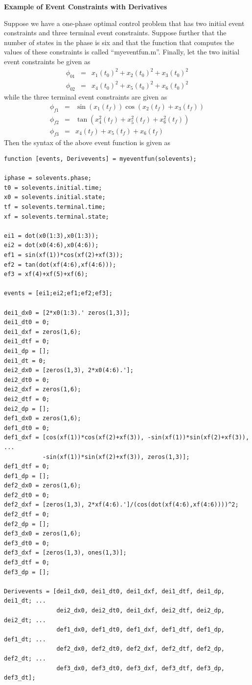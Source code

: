 \documentclass[10pt,final]{report}
\newenvironment{shadedframe}{%
  \def\FrameCommand{\fcolorbox{black}{shadecolor}}%
  \MakeFramed {\FrameRestore}}
{\endMakeFramed}
\begin{document}
\begin{shadedframe}
{\noindent}{\bf Example of Event Constraints with Derivatives}
\vspace{12pt}

{\noindent}Suppose we have a one-phase optimal control problem that has two
initial event constraints and three terminal event constraints.  Suppose
further that the number of states in the phase is six and that the function
that computes the values of these constraints is called ``myeventfun.m''.
Finally, let the two initial event constraints be given as
\begin{displaymath}
  \begin{array}{lcl}
    \phi_{01} & = & x_1(t_0)^2+x_2(t_0)^2+x_3(t_0)^2 \\
    \phi_{02} & = & x_4(t_0)^2+x_5(t_0)^2+x_6(t_0)^2
  \end{array}
\end{displaymath}
while the three terminal event constraints are given as
\begin{displaymath}
  \begin{array}{lcl}
    \phi_{f1} & = & \sin(x_1(t_f))\cos(x_2(t_f)+x_3(t_f)) \\
    \phi_{f2} & = & \tan(x_4^2(t_f)+x_5^2(t_f)+x_6^2(t_f)) \\
    \phi_{f3} & = & x_4(t_f)+x_5(t_f)+x_6(t_f)
  \end{array}
\end{displaymath}
Then the syntax of the above event function is given as
\begin{verbatim}
function [events, Derivevents] = myeventfun(solevents);

iphase = solevents.phase;
t0 = solevents.initial.time;
x0 = solevents.initial.state;
tf = solevents.terminal.time;
xf = solevents.terminal.state;

ei1 = dot(x0(1:3),x0(1:3));
ei2 = dot(x0(4:6),x0(4:6));
ef1 = sin(xf(1))*cos(xf(2)+xf(3));
ef2 = tan(dot(xf(4:6),xf(4:6)));
ef3 = xf(4)+xf(5)+xf(6);

events = [ei1;ei2;ef1;ef2;ef3];

dei1_dx0 = [2*x0(1:3).' zeros(1,3)];
dei1_dt0 = 0;
dei1_dxf = zeros(1,6);
dei1_dtf = 0;
dei1_dp = [];
dei1_dt = 0;
dei2_dx0 = [zeros(1,3), 2*x0(4:6).'];
dei2_dt0 = 0;
dei2_dxf = zeros(1,6);
dei2_dtf = 0;
dei2_dp = [];
def1_dx0 = zeros(1,6);
def1_dt0 = 0;
def1_dxf = [cos(xf(1))*cos(xf(2)+xf(3)), -sin(xf(1))*sin(xf(2)+xf(3)), ...
           -sin(xf(1))*sin(xf(2)+xf(3)), zeros(1,3)];
def1_dtf = 0;
def1_dp = [];
def2_dx0 = zeros(1,6);
def2_dt0 = 0;
def2_dxf = [zeros(1,3), 2*xf(4:6).']/(cos(dot(xf(4:6),xf(4:6))))^2;
def2_dtf = 0;
def2_dp = [];
def3_dx0 = zeros(1,6);
def3_dt0 = 0;
def3_dxf = [zeros(1,3), ones(1,3)];
def3_dtf = 0;
def3_dp = [];

Derivevents = [dei1_dx0, dei1_dt0, dei1_dxf, dei1_dtf, dei1_dp, dei1_dt; ...
               dei2_dx0, dei2_dt0, dei1_dxf, dei2_dtf, dei2_dp, dei2_dt; ...
               def1_dx0, def1_dt0, def1_dxf, def1_dtf, def1_dp, def1_dt; ...
               def2_dx0, def2_dt0, def2_dxf, def2_dtf, def2_dp, def2_dt; ...
               def3_dx0, def3_dt0, def3_dxf, def3_dtf, def3_dp, def3_dt];
\end{verbatim}
\end{shadedframe}
\end{document}
